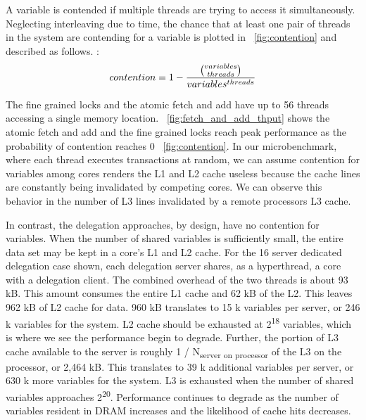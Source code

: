 \documentclass{uicthesi}
\begin{document}
A variable is contended if multiple threads are trying to access it simultaneously. Neglecting interleaving due to time, the chance that at least one pair of threads in the system are contending for a variable is plotted in ~\ref{fig:contention} and described as follows. : 
\begin{displaymath}
contention = 1 - {{ variables \choose threads }  \over  variables^{threads}}
\end{displaymath}


The fine grained locks and the atomic fetch and add have up to 56 threads accessing a single memory location. ~\ref{fig:fetch_and_add_thput} shows the atomic fetch and add and the fine grained locks reach peak performance as the probability of contention reaches 0 ~\ref{fig:contention}. In our microbenchmark, where each thread executes transactions at random, we can assume contention for variables among cores renders the L1 and L2 cache useless because the cache lines are constantly being invalidated by competing cores. We can observe this behavior in the number of L3 lines invalidated by a remote processors L3 cache. 

In contrast, the delegation approaches, by design, have no contention for variables. When the number of shared variables is sufficiently small, the entire data set may be kept in a core's L1 and L2 cache. For the 16 server dedicated delegation case shown, each delegation server shares, as a hyperthread, a core with a delegation client. The combined overhead of the two threads is about 93 kB. This amount consumes the entire L1 cache and 62 kB of the L2. This leaves 962 kB of L2 cache for data. 960 kB translates to 15 k variables per server, or 246 k variables for the system. L2 cache should be exhausted at 2\textsuperscript{18} variables, which is where we see the performance begin to degrade. Further, the portion of L3 cache available to the server is roughly 1 / N\textsubscript{server on processor} of the L3 on the processor, or 2,464 kB. This translates to 39 k additional variables per server, or 630 k more variables for the system. L3 is exhausted when the number of shared variables approaches 2\textsuperscript{20}. Performance continues to degrade as the number of variables resident in DRAM increases and the likelihood of cache hits decreases. 

\end{document}
